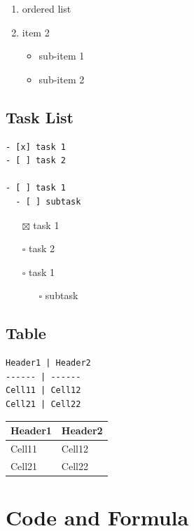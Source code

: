 \documentclass[
]{book}
\providecommand{\tightlist}{%
  \setlength{\itemsep}{0pt}\setlength{\parskip}{0pt}}
\begin{document}
\begin{enumerate}
\def\labelenumi{\arabic{enumi}.}
\tightlist
\item
  ordered list
\item
  item 2

  \begin{itemize}
  \tightlist
  \item
    sub-item 1
  \item
    sub-item 2
  \end{itemize}
\end{enumerate}

\hypertarget{task-list}{%
\section{Task List}\label{task-list}}

\begin{verbatim}
- [x] task 1
- [ ] task 2 

- [ ] task 1
  - [ ] subtask
\end{verbatim}

\begin{itemize}
\item[$\boxtimes$]
  task 1
\item[$\square$]
  task 2
\item[$\square$]
  task 1

  \begin{itemize}
  \tightlist
  \item[$\square$]
    subtask
  \end{itemize}
\end{itemize}

\hypertarget{table}{%
\section{Table}\label{table}}

\begin{verbatim}
Header1 | Header2
------ | ------
Cell11 | Cell12
Cell21 | Cell22 
\end{verbatim}

\begin{longtable}[]{@{}ll@{}}
\toprule
Header1 & Header2 \\
\midrule
\endhead
Cell11 & Cell12 \\
Cell21 & Cell22 \\
\bottomrule
\end{longtable}

\hypertarget{code-and-formula}{%
\chapter{Code and Formula}\label{code-and-formula}}
\end{document}
